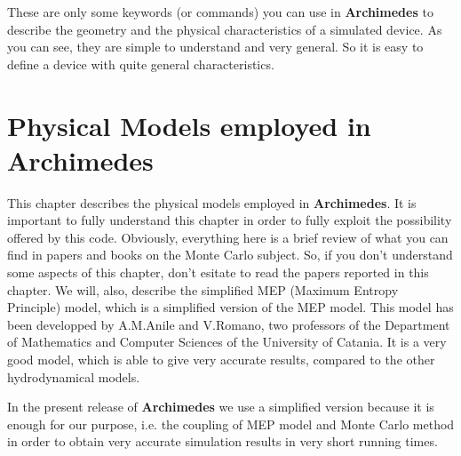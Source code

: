 \documentclass[12pt]{book}
\begin{document}
These are only some keywords (or commands) you can use in \textbf{Archimedes} to describe the geometry and the physical characteristics of a simulated device. As you can see, they are simple to understand and very general. So it is easy to define a device with quite general characteristics.

\chapter{Physical Models employed in \textbf{Archimedes}}

This chapter describes the physical models employed in \textbf{Archimedes}. It is important to fully understand this chapter in order to fully exploit the possibility offered by this code. Obviously, everything here is a brief review of what you can find in papers and books on the Monte Carlo subject. So, if you don't understand some aspects of this chapter, don't esitate to read the papers reported in this chapter. We will, also, describe the simplified MEP (Maximum Entropy Principle) model, which is a simplified version of the MEP model. This model has been developped by A.M.Anile and V.Romano, two professors of the Department of Mathematics and Computer Sciences of the University of Catania. It is a very good model, which is able to give very accurate results, compared to the other hydrodynamical models. 

In the present release of \textbf{Archimedes} we use a simplified version because it is enough for our purpose, i.e. the coupling of MEP model and Monte Carlo method in order to obtain very accurate simulation results in very short running times.
\end{document}
